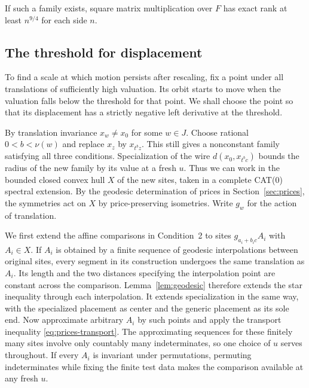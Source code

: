 \begin{theorem}\label{thm:motion}
 If such a family exists, square matrix multiplication over $F$ has exact rank at least $n^{9/4}$ for each side $n$.
\end{theorem}

\subsection{The threshold for displacement}

To find a scale at which motion persists after rescaling, fix a point
under all translations of sufficiently high valuation. Its orbit
starts to move when the valuation falls below the threshold for that
point. We shall choose the point so that its displacement has a
strictly negative left derivative at the threshold.

By translation invariance \(x_w\ne x_0\) for some \(w\in J\). Choose
rational \(0<b<\nu(w)\) and replace \(x_z\) by \(x_{t^b z}\). This
still gives a nonconstant family satisfying all three conditions.
Specialization of the wire \(d(x_0,x_{t^bc})\) bounds the radius of
the new family by its value at a fresh \(u\). Thus we can work in the
bounded closed convex hull \(X\) of the new sites, taken in a complete
CAT(0) spectral extension. By the geodesic determination of prices in
Section~\ref{sec:prices}, the symmetries act on \(X\) by
price-preserving isometries. Write \(g_w\) for the action of translation.

We first extend the affine comparisons in Condition~2 to sites
\(g_{a_i+b_i c}A_i\) with \(A_i\in X\). If \(A_i\) is obtained by a
finite sequence of geodesic interpolations between original sites,
every segment in its construction undergoes the same translation as
\(A_i\). Its length and the two distances specifying the interpolation
point are constant across the comparison. Lemma~\ref{lem:geodesic}
therefore extends the star inequality through each interpolation. It
extends specialization in the same way, with the specialized placement
as center and the generic placement as its sole end. Now approximate
arbitrary \(A_i\) by such points and apply the transport inequality
\eqref{eq:prices-transport}. The approximating sequences for these
finitely many sites involve only countably many indeterminates, so one
choice of \(u\) serves throughout. If every \(A_i\) is invariant under
permutations, permuting indeterminates while fixing the finite test
data makes the comparison available at any fresh \(u\).

